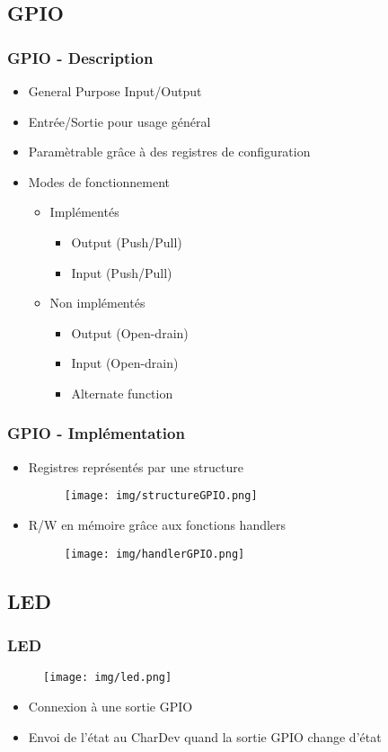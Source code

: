 \documentclass{beamer}
\begin{document}
		\subsection{GPIO}
			\begin{frame}
				\frametitle{GPIO - Description}
				\begin{itemize}
					\item General Purpose Input/Output
					\item Entrée/Sortie pour usage général
					\item Paramètrable grâce à des registres de configuration
					\item Modes de fonctionnement
						\begin{itemize}
							\item Implémentés
								\begin{itemize}
									\item Output (Push/Pull)
									\item Input (Push/Pull)
								\end{itemize}
							\item Non implémentés
								\begin{itemize}
									\item Output (Open-drain)
									\item Input (Open-drain)
									\item Alternate function
								\end{itemize}
						\end{itemize}
				\end{itemize}
			\end{frame}
			
			\begin{frame}
				\frametitle{GPIO - Implémentation}
				\begin{itemize}
					\item Registres représentés par une structure
						\begin{figure}
							\texttt{[image: img/structureGPIO.png]}
						\end{figure}
					\item R/W en mémoire grâce aux fonctions handlers
						\begin{figure}
							\texttt{[image: img/handlerGPIO.png]}
						\end{figure}
				\end{itemize}
			\end{frame}
		
		
		\subsection{LED}
			\begin{frame}
				\frametitle{LED}
				\begin{figure}
					\texttt{[image: img/led.png]}
				\end{figure}
				\begin{itemize}
					\item Connexion à une sortie GPIO
					\item Envoi de l'état au CharDev quand la sortie GPIO change d'état
				\end{itemize}
			\end{frame}
		
\end{document}
